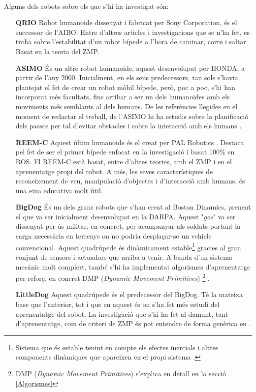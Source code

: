 \documentclass[12pt,a4paper,final,twoside]{article}
\begin{document}
\paragraph{}Alguns dels robots sobre els que s'hi ha investigat són:
\begin{itemize}
\item[\textbf{QRIO}] Robot humanoide dissenyat i fabricat per Sony Corporation, és el successor de l'AIBO. Entre d'altres articles i investigacions que se n'ha fet, es troba \cite{Nagasaka2004} sobre l'estabilitat d'un robot bípede a l'hora de caminar, corre i saltar. Basat en la teoria del ZMP.

\item[\textbf{ASIMO}] És un altre robot humanoide, aquest desenvolupat per HONDA, a partir de l'any 2000. Inicialment, en els seus predecessors, tan sols s'havia plantejat el fet de crear un robot mòbil bípede, però, poc a poc, s'hi han incorporat més facultats, fins arribar a ser un dels humanoides amb els moviments més semblants al dels humans\cite{ASIMO_History}. De les referències llegides en el moment de redactar el treball, de l'ASIMO hi ha estudis sobre la planificació dels passos per tal d'evitar obstacles \cite{Chestnutt2005} i sobre la interacció amb els humans \cite{Mutlu2006}.

\item[\textbf{REEM-C}] Aquest últim humanoide és el creat per PAL Robotics \cite{REEM_C}. Destaca pel fet de ser el primer bípede enfocat en la investigació i basat 100\% en ROS. El REEM-C està basat, entre d'altres teories, amb el ZMP i en el aprenentatge propi del robot. A més, les seves característiques de reconeixement de veu, manipulació d'objectes i d'interacció amb humans, és una eina educativa molt útil. \cite{Robotics}

\item[\textbf{BigDog}] És un dels grans robots que s'han creat al Boston Dinamics, prenent el que va ser inicialment desenvolupat en la DARPA\cite{Marc2008}. Aquest "\textit{gos}" va ser dissenyat per ús militar, en concret, per acompanyar als soldats portant la carga necessària en terrenys on no podria desplaçar-se un vehicle convencional. Aquest quadrúpede és dinàmicament estable\footnote{Sistema que és estable tenint en compte els efectes inercials i altres components dinàmiques que apareixen en el propi sistema \cite{Purushotham2009}.} gracies al gran conjunt de sensors i actuadors que arriba a tenir. A banda d'un sistema mecànic molt complert, també s'hi ha implementat algorismes d'aprenentatge per reforç, en concret DMP (\textit{Dynamic Movement Primitives}) \footnote{DMP (\textit{Dynamic Movement Primitives}) s'explica en detall en la secció \ref{Algorismes} } \cite{Playter2006}.

\item[\textbf{LittleDog}] Aquest quadrúpede és el predecessor del BigDog. Té la mateixa base que l'anterior, tot i que en aquest és on s'ha fet més estudi del aprenentatge del robot. La investigació que s'hi ha fet al damunt, tant d'aprenentatge, com de criteri de ZMP és pot entendre de forma genèrica en \cite{Kalakrishnan2010}. 

\end{itemize}
\end{document}

